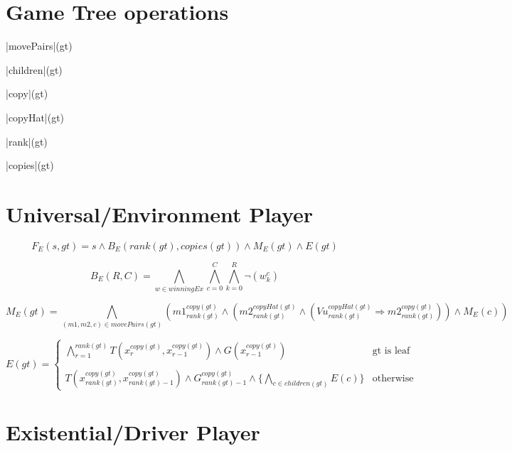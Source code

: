 \documentclass[a4paper,10pt]{article}
\begin{document}
\section{Game Tree operations}

\begin{algorithm}
\begin{program}
    |movePairs|(gt) 

    |children|(gt) 

    |copy|(gt) 

    |copyHat|(gt) 

    |rank|(gt) 

    |copies|(gt) 

\end{program}
\end{algorithm}

\section{Universal/Environment Player}
$$
F_E(s, gt) = s \land B_E(rank(gt), copies(gt)) \land M_E(gt) \land E(gt)
$$

$$
B_E(R, C) = \bigwedge\limits_{w \in winningEx} \bigwedge\limits_{c = 0}^C \bigwedge\limits_{k = 0}^R \lnot(w_k^c)
$$


$$
M_E(gt) = \bigwedge\limits_{(m1, m2, c) \in movePairs(gt)} (m1_{rank(gt)}^{copy(gt)} \land (m2_{rank(gt)}^{copyHat(gt)} \land (Vu_{rank(gt)}^{copyHat(gt)} \Rightarrow m2_{rank(gt)}^{copy(gt)})) \land M_E(c))
$$

\[
E(gt) = 
\begin{cases}
    \bigwedge\limits_{r = 1}^{rank(gt)} T(x_r^{copy(gt)}, x_{r-1}^{copy(gt)}) \land G(x_{r-1}^{copy(gt)}) & \text{gt is leaf} \\
    \\
    T(x_{rank(gt)}^{copy(gt)}, x_{rank(gt)-1}^{copy(gt)}) \land G_{rank(gt)-1}^{copy(gt)} \land \lbrace\bigwedge\limits_{c \in children(gt)} E(c)\rbrace & \text{otherwise}
\end{cases}
\]

\section{Existential/Driver Player}
\end{document}
